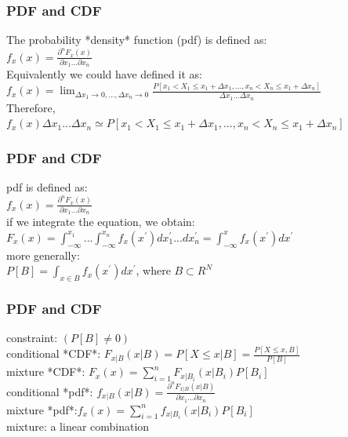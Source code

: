 \documentclass{beamer}
\begin{document}
\begin{frame}
\frametitle{PDF and CDF}
The probability *density* function (pdf) is defined as:\newline\\
$f_x(x) = \frac{\partial^n{F_x(x)}}{\partial{x_1}...\partial{x_n}}$\newline\\
Equivalently we could have defined it as:\newline\\
$f_x(x) = {\lim_{\Delta x_1 \to 0,...,\Delta x_n \to 0} \frac{P[x_1<X_1\le x_1+\Delta x_1,...,x_n<X_n\le x_1+\Delta x_n]}{\Delta x_1...\Delta x_n}}$\newline\\
Therefore, \newline\\
$f_x(x) \Delta x_1...\Delta x_n \simeq {P[x_1<X_1\le x_1+\Delta x_1,...,x_n<X_n\le x_1+\Delta x_n]}$\newline\\
\end{frame}

\begin{frame}
\frametitle{PDF and CDF}
pdf is defined as:\newline\\
$f_x(x) = \frac{\partial^n{F_x(x)}}{\partial{x_1}...\partial{x_n}}$\newline\\
if we integrate the equation, we obtain:\newline\\
$F_x(x) = \int_{-\infty}^{x_1}...\int_{-\infty}^{x_n} f_x(x^{'})dx_1^{'}...dx_n^{'} = \int_{-\infty}^{x} f_x(x^{'})dx^{'}$\newline\\
more generally:\newline\\
$P [B] = \int_{x \in B} f_x(x^{'})dx^{'} $, where $B \subset R^N$
\end{frame}

\begin{frame}
\frametitle{PDF and CDF}
constraint: $(P[B]\neq 0)$\newline\\
conditional *CDF*: $F_{x|B}(x|B) = P[X\le x|B] = \frac{P[X\le x,B]}{P[B]}$  \newline\\

mixture *CDF*: $F_x(x) = \sum _{i=1}^{n} F_{x|B_i}(x|B_i)P[B_i]$ \newline\\
conditional *pdf*: $f_{x|B}(x|B)=\frac{\partial^n{F_{x|B}(x|B)}}{\partial{x_1}...\partial{x_n}}$ \newline\\
mixture *pdf*:$f_x(x) =\sum _{i=1}^{n} f_{x|B_i}(x|B_i)P[B_i]$\newline\\
mixture: a linear combination
\end{frame}
\end{document}
